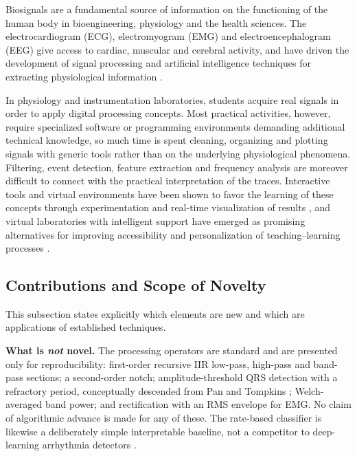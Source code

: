 \documentclass[conference]{IEEEtran}
\begin{document}
Biosignals are a fundamental source of information on the functioning of the human body in bioengineering, physiology and the health sciences. The electrocardiogram (ECG), electromyogram (EMG) and electroencephalogram (EEG) give access to cardiac, muscular and cerebral activity, and have driven the development of signal processing and artificial intelligence techniques for extracting physiological information \cite{ANBALAGAN2023100089,MISHRA2026110958,WANG2026103417}.

In physiology and instrumentation laboratories, students acquire real signals in order to apply digital processing concepts. Most practical activities, however, require specialized software or programming environments demanding additional technical knowledge, so much time is spent cleaning, organizing and plotting signals with generic tools rather than on the underlying physiological phenomena. Filtering, event detection, feature extraction and frequency analysis are moreover difficult to connect with the practical interpretation of the traces. Interactive tools and virtual environments have been shown to favor the learning of these concepts through experimentation and real-time visualization of results \cite{CHACON202413,DEB202464,ROSAS2022218}, and virtual laboratories with intelligent support have emerged as promising alternatives for improving accessibility and personalization of teaching--learning processes \cite{WAHAB2026109490,KUMAR2022100480}.

\subsection{Contributions and Scope of Novelty}
\label{sec:novelty}

This subsection states explicitly which elements are new and which are applications of established techniques.

\textbf{What is \emph{not} novel.} The processing operators are standard and are presented only for reproducibility: first-order recursive IIR low-pass, high-pass and band-pass sections; a second-order notch; amplitude-threshold QRS detection with a refractory period, conceptually descended from Pan and Tompkins \cite{panTompkins1985}; Welch-averaged band power; and rectification with an RMS envelope for EMG. No claim of algorithmic advance is made for any of these. The rate-based classifier is likewise a deliberately simple interpretable baseline, not a competitor to deep-learning arrhythmia detectors \cite{LI2022103424,HONG2022109213}.
\end{document}
